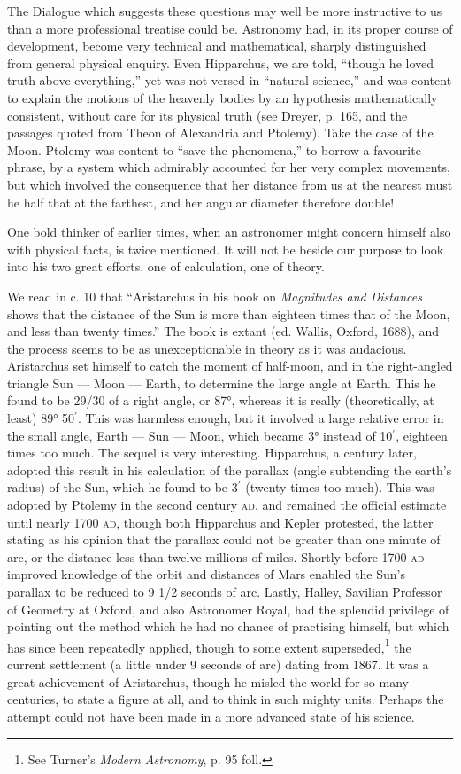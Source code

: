 \documentclass[a4paper, 11pt, oneside, polutonikogreek, english]{article}
\begin{document}
The Dialogue which suggests these questions may well be more instructive to us than a more professional treatise could be. Astronomy had, in its proper course of development, become very technical and mathematical, sharply distinguished from general physical enquiry. Even Hipparchus, we are told, ``though he loved truth above everything,'' yet was not versed in ``natural science,'' and was content to explain the motions of the heavenly bodies by an hypothesis mathematically consistent, without care for its physical truth (see Dreyer, p. 165, and the passages quoted from Theon of Alexandria and Ptolemy). Take the case of the Moon. Ptolemy was content to ``save the phenomena,'' to borrow a favourite phrase, by a system which admirably accounted for her very complex movements, but which involved the consequence that her distance from us at the nearest must he half that at the farthest, and her angular diameter therefore double!

One bold thinker of earlier times, when an astronomer might concern himself also with physical facts, is twice mentioned. It will not be beside our purpose to look into his two great efforts, one of calculation, one of theory.

We read in c. 10 that ``Aristarchus in his book on \emph{Magnitudes and Distances} shows that the distance of the Sun is more than eighteen times that of the Moon, and less than twenty times.'' The book is extant (ed. Wallis, Oxford, 1688), and the process seems to be as unexceptionable in theory as it was audacious. Aristarchus set himself to catch the moment of half-moon, and in the right-angled triangle Sun --- Moon --- Earth, to determine the large angle at Earth. This he found to be 29/30 of a right angle, or 87°, whereas it is really (theoretically, at least) 89° 50$^{\prime}$. This was harmless enough, but it involved a large relative error in the small angle, Earth --- Sun --- Moon, which became 3° instead of 10$^{\prime}$, eighteen times too much. The sequel is very interesting. Hipparchus, a century later, adopted this result in his calculation of the parallax (angle subtending the earth's radius) of the Sun, which he found to be 3$^{\prime}$ (twenty times too much). This was adopted by Ptolemy in the second century \textsc{ad}, and remained the official estimate until nearly 1700 \textsc{ad}, though both Hipparchus and Kepler protested, the latter stating as his opinion that the parallax could not be greater than one minute of arc, or the distance less than twelve millions of miles. Shortly before 1700 \textsc{ad} improved knowledge of the orbit and distances of Mars enabled the Sun's parallax to be reduced to 9 1/2 seconds of arc. Lastly, Halley, Savilian Professor of Geometry at Oxford, and also Astronomer Royal, had the splendid privilege of pointing out the method which he had no chance of practising himself, but which has since been repeatedly applied, though to some extent superseded,\footnote{See Turner's \emph{Modern Astronomy}, p. 95 foll.} the current settlement (a little under 9 seconds of arc) dating from 1867. It was a great achievement of Aristarchus, though he misled the world for so many centuries, to state a figure at all, and to think in such mighty units. Perhaps the attempt could not have been made in a more advanced state of his science.
\end{document}
